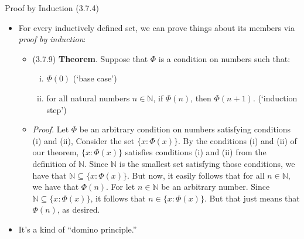 \begin{frame}{Proof by Induction (3.7.4)}

	\begin{itemize}
	
	
		\item For every inductively defined set, we can prove things about its members via \emph{proof by induction}:
		
		\begin{itemize}
		
			\item (3.7.9) \textbf{Theorem}. Suppose that $\Phi$ is a condition on numbers such that:
		\begin{enumerate}[(i)]
		
			\item $\Phi(0)$ (`base case')
			
			\item for all natural numbers $n\in\mathbb{N}$, if $\Phi(n)$, then $\Phi(n+1)$. (`induction step')
		
		\end{enumerate}
		
		\item \emph{Proof}. Let $\Phi$ be an arbitrary condition on numbers satisfying conditions (i) and (ii), Consider the set $\{x:\Phi(x)\}$. By the conditions (i) and (ii) of our theorem, $\{x:\Phi(x)\}$ satisfies conditions (i) and (ii) from the definition of $\mathbb{N}$. Since $\mathbb{N}$ is the smallest set satisfying those conditions, we have that $\mathbb{N}\subseteq\{x:\Phi(x)\}$. But now, it easily follows that for all $n\in\mathbb{N}$, we have that $\Phi(n)$. For let $n\in\mathbb{N}$ be an arbitrary number. Since $\mathbb{N}\subseteq\{x:\Phi(x)\}$, it follows that $n\in\{x:\Phi(x)\}$. But that just means that $\Phi(n)$, as desired.
		
		\end{itemize}
		
		\item It's a kind of ``domino principle.''
	
	\end{itemize}


\end{frame}

